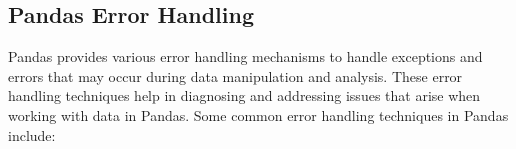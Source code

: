 \begin{code}[h!]
	    
	
	\caption{Reading CSV file }
	
\end{code}

\subsection{Pandas Error Handling}

Pandas provides various error handling mechanisms to handle exceptions and errors that may occur during data manipulation and analysis. These error handling techniques help in diagnosing and addressing issues that arise when working with data in Pandas. Some common error handling techniques in Pandas include:

